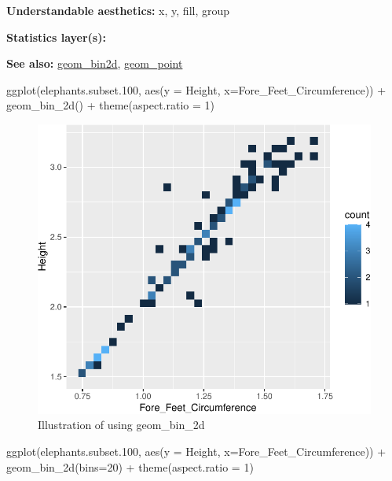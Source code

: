 \documentclass[
]{book}
\newenvironment{Shaded}{\begin{snugshade}}{\end{snugshade}}
\newcommand{\AttributeTok}[1]{\textcolor[rgb]{0.77,0.63,0.00}{#1}}
\newcommand{\DecValTok}[1]{\textcolor[rgb]{0.00,0.00,0.81}{#1}}
\newcommand{\FloatTok}[1]{\textcolor[rgb]{0.00,0.00,0.81}{#1}}
\newcommand{\FunctionTok}[1]{\textcolor[rgb]{0.00,0.00,0.00}{#1}}
\newcommand{\NormalTok}[1]{#1}
\newcommand{\SpecialCharTok}[1]{\textcolor[rgb]{0.00,0.00,0.00}{#1}}
\begin{document}
\textbf{Understandable aesthetics: } x, y, fill, group

\textbf{Statistics layer(s): }

\textbf{See also: } \protect\hyperlink{bin2d}{geom\_bin2d}, \protect\hyperlink{point}{geom\_point}

\begin{Shaded}
\begin{Highlighting}[]
\FunctionTok{ggplot}\NormalTok{(elephants.subset}\FloatTok{.100}\NormalTok{, }\FunctionTok{aes}\NormalTok{(}\AttributeTok{y =}\NormalTok{ Height, }\AttributeTok{x=}\NormalTok{Fore\_Feet\_Circumference)) }\SpecialCharTok{+}
  \FunctionTok{geom\_bin\_2d}\NormalTok{() }\SpecialCharTok{+} 
  \FunctionTok{theme}\NormalTok{(}\AttributeTok{aspect.ratio =} \DecValTok{1}\NormalTok{)}
\end{Highlighting}
\end{Shaded}

\begin{figure}
\centering
\includegraphics{Data-Visualisation-geom-Encyclopedia_files/figure-latex/unnamed-chunk-23-1.pdf}
\caption{\label{fig:unnamed-chunk-23}Illustration of using geom\_bin\_2d}
\end{figure}

\begin{Shaded}
\begin{Highlighting}[]
\FunctionTok{ggplot}\NormalTok{(elephants.subset}\FloatTok{.100}\NormalTok{, }\FunctionTok{aes}\NormalTok{(}\AttributeTok{y =}\NormalTok{ Height, }\AttributeTok{x=}\NormalTok{Fore\_Feet\_Circumference)) }\SpecialCharTok{+}
  \FunctionTok{geom\_bin\_2d}\NormalTok{(}\AttributeTok{bins=}\DecValTok{20}\NormalTok{) }\SpecialCharTok{+} 
  \FunctionTok{theme}\NormalTok{(}\AttributeTok{aspect.ratio =} \DecValTok{1}\NormalTok{)}
\end{Highlighting}
\end{Shaded}
\end{document}
